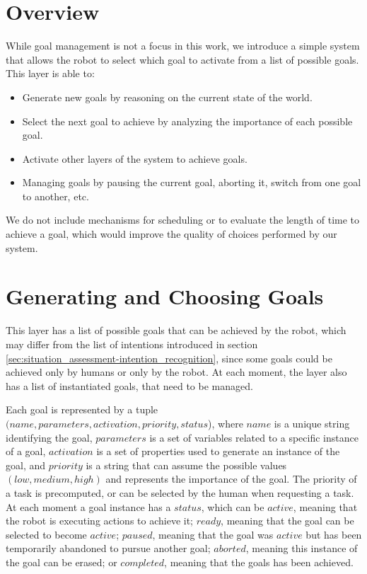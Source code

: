\section{Overview}
\label{sec:goal_management-overview}
While goal management is not a focus in this work, we introduce a simple system that allows the robot to select which goal to activate from a list of possible goals. This layer is able to:

\begin{itemize}
\item Generate new goals by reasoning on the current state of the world.
\item Select the next goal to achieve by analyzing the importance of each possible goal.
\item Activate other layers of the system to achieve goals.
\item Managing goals by pausing the current goal, aborting it, switch from one goal to another, etc.
\end{itemize}


We do not include mechanisms for scheduling or to evaluate the length of time to achieve a goal, which would improve the quality of choices performed by our system.

\section{Generating and Choosing Goals}
\label{sec:goal_management-choosing}
This layer has a list of possible goals that can be achieved by the robot, which may differ from the list of intentions introduced in section \ref{sec:situation_assessment-intention_recognition}, since some goals could be achieved only by humans or only by the robot. At each moment, the layer also has a list of instantiated goals, that need to be managed.

Each goal is represented by a tuple $(name, parameters, activation, priority, status$), where $name$ is a unique string identifying the goal, $parameters$ is a set of variables related to a specific instance of a goal, $activation$ is a set of properties used to generate an instance of the goal, and $priority$ is a string that can assume the possible values $(low, medium, high)$ and represents the importance of the goal. The priority of a task is precomputed, or can be selected by the human when requesting a task. At each moment a goal instance has a $status$, which can be $active$, meaning that the robot is executing actions to achieve it; $ready$, meaning that the goal can be selected to become $active$; $paused$, meaning that the goal was $active$ but has been temporarily abandoned to pursue another goal; $aborted$, meaning this instance of the goal can be erased; or $completed$, meaning that the goals has been achieved.  

